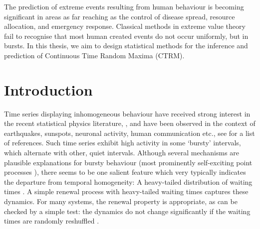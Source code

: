 \documentclass[honours,12pt]{UNSWthesis}
\newcommand{\1}{\mathbf 1}
\newcommand\blankpage{%
    \null
    \thispagestyle{empty}%
    \addtocounter{page}{-1}%
    \newpage}
\numberwithin{equation}{section}
\theoremstyle{definition}
\theoremstyle{remark}
\begin{document}


The prediction of extreme events resulting from human
behaviour is becoming significant in areas as far reaching as the
control of disease spread, resource allocation, and emergency
response.  Classical methods in extreme value theory fail to recognise
that most human created events do not occur uniformly, but in bursts.
In this thesis, we aim to design statistical methods for the inference
and prediction of Continuous Time Random Maxima (CTRM).
\afterpage{\blankpage}


\afterpreface

%
%

\afterpage{\blankpage}

\chapter{Introduction}\label{s-intro}
Time series displaying inhomogeneous behaviour have received strong interest in 
the recent statistical physics literature,
\cite{Barabasi2005,Oliveira2005,Vasquez2006,Vazquez2007,Omi2011,
Min2010,Karsai2011,Bagrow2013},
and have been observed in the context of earthquakes, sunspots, neuronal
activity, human communication etc., see \cite{Karsai2012,Vajna2013} for a 
list of references.
Such time series exhibit high activity in some `bursty' intervals, which 
alternate with other, quiet intervals.  Although several mechanisms are 
plausible explanations for bursty behaviour
(most prominently self-exciting point processes \cite{hawkes1971point}),
there seems to be one salient
feature which very typically indicates the departure from temporal homogeneity: 
A heavy-tailed distribution of waiting times
\cite{Vasquez2006,Karsai2012,Vajna2013}. 
A simple renewal process with heavy-tailed waiting times captures these
dynamics. For many systems, the renewal property is appropriate, as can be
checked by a simple test: the dynamics do not change significantly if the
waiting times are randomly reshuffled \cite{Karsai2012}.
\end{document}
